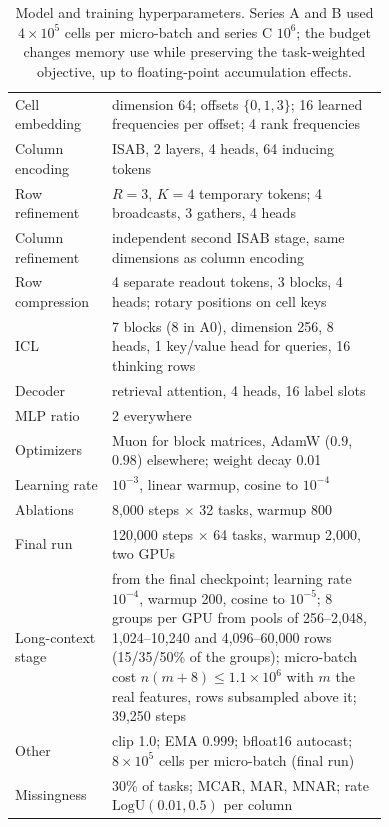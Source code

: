 \documentclass[11pt]{article}
\begin{document}
\begin{table}[h]
\centering
\small
\begin{tabular}{lp{0.74\linewidth}}
\toprule
Cell embedding & dimension 64; offsets $\{0,1,3\}$; 16 learned frequencies per offset; 4 rank frequencies \\
Column encoding & ISAB, 2 layers, 4 heads, 64 inducing tokens \\
Row refinement & $R=3$, $K=4$ temporary tokens; 4 broadcasts, 3 gathers, 4 heads \\
Column refinement & independent second ISAB stage, same dimensions as column encoding \\
Row compression & 4 separate readout tokens, 3 blocks, 4 heads; rotary positions on cell keys \\
ICL & 7 blocks (8 in A0), dimension 256, 8 heads, 1 key/value head for queries, 16 thinking rows \\
Decoder & retrieval attention, 4 heads, 16 label slots \\
MLP ratio & 2 everywhere \\
\midrule
Optimizers & Muon for block matrices, AdamW ($0.9$, $0.98$) elsewhere; weight decay 0.01 \\
Learning rate & $10^{-3}$, linear warmup, cosine to $10^{-4}$ \\
Ablations & 8,000 steps $\times$ 32 tasks, warmup 800 \\
Final run & 120,000 steps $\times$ 64 tasks, warmup 2,000, two GPUs \\
Long-context stage & from the final checkpoint; learning rate $10^{-4}$, warmup 200, cosine to $10^{-5}$;
  8 groups per GPU from pools of 256--2,048, 1,024--10,240 and 4,096--60,000 rows (15/35/50\% of the
  groups); micro-batch cost $n(m+8)\le1.1\times10^6$ with $m$ the real features, rows subsampled
  above it; 39,250 steps \\
Other & clip 1.0; EMA 0.999; bfloat16 autocast; $8\times10^5$ cells per micro-batch (final run) \\
Missingness & 30\% of tasks; MCAR, MAR, MNAR; rate $\mathrm{LogU}(0.01,0.5)$ per column \\
\bottomrule
\end{tabular}
\caption{Model and training hyperparameters. Series A and B used $4\times10^5$ cells per micro-batch
and series C $10^6$; the budget changes memory use while preserving the task-weighted objective,
up to floating-point accumulation effects.}
\end{table}
\end{document}
